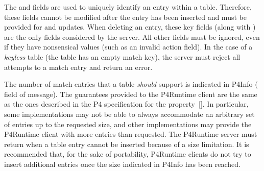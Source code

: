\documentclass[11pt]{article}
\begin{document}
{%
The  and  fields are used to uniquely identify an entry within
a table. Therefore, these fields cannot be modified after the entry has been
inserted and must be provided for  and  updates. When deleting
an entry, these key fields (along with ) are the only fields
considered by the server. All other fields must be ignored, even if they have
nonsensical values (such as an invalid action field). In the case of a \emph{keyless}
table (the table has an empty match key), the server must reject all attempts to
 a match entry and return an  error.%

The number of match entries that a table \emph{should} support is indicated in P4Info
( field of  message). The guarantees provided to the P4Runtime
client are the same as the ones described in the P4 specification for the
 property~[]. In particular, some implementations may
not be able to always accommodate an arbitrary set of entries up to the
requested size, and other implementations may provide the P4Runtime client with
more entries than requested. The P4Runtime server must return
 when a table entry cannot be inserted because of a size
limitation. It is recommended that, for the sake of portability, P4Runtime
clients do not try to insert additional entries once the size indicated in
P4Info has been reached.%

}
\end{document}
